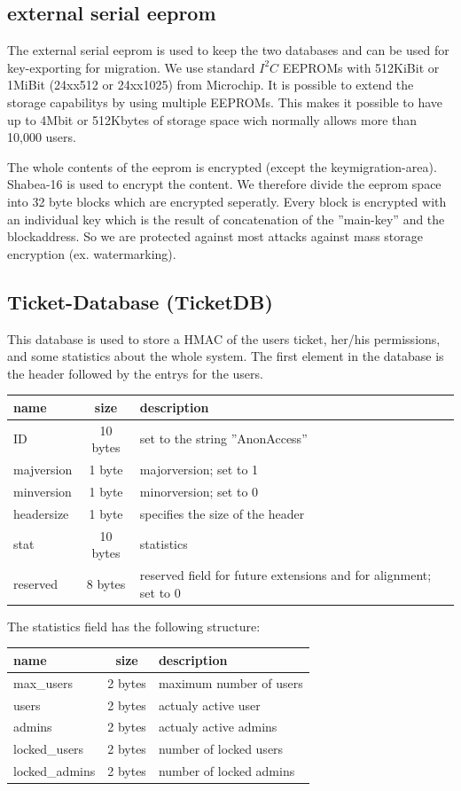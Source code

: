 
\subsection{external serial eeprom}
The external serial eeprom is used to keep the two databases and can be used for key-exporting for migration. We use standard $I^2C$ EEPROMs with 512KiBit or 1MiBit (24xx512 or 24xx1025) from Microchip. It is possible to extend the storage capabilitys by using multiple EEPROMs. This makes it possible to have up to 4Mbit or 512Kbytes of storage space wich normally allows more than 10,000 users.

The whole contents of the eeprom is encrypted (except the keymigration-area). Shabea-16 is used to encrypt the content. We therefore divide the eeprom space into 32 byte blocks which are encrypted seperatly. Every block is encrypted with an individual key which is the result of concatenation of the ''main-key'' and the blockaddress. So we are protected against most attacks against mass storage encryption (ex. watermarking).


\subsection{Ticket-Database (TicketDB)}
This database is used to store a HMAC of the users ticket, her/his permissions, and some statistics about the whole system.
The first element in the database is the header followed by the entrys for the users.\\
\begin{tabular}{|l|c|l|}\hline 
name & size & description \\ \hline
ID & 10 bytes & set to the string ''AnonAccess'' \\
majversion & 1 byte & majorversion; set to 1 \\
minversion & 1 byte & minorversion; set to 0 \\
headersize & 1 byte & specifies the size of the header \\
stat & 10 bytes & statistics \\
reserved & 8 bytes & reserved field for future extensions and for alignment; set to 0 \\ \hline
\end{tabular} 

The statistics field has the following structure:\\
\begin{tabular}{|l|c|l|} \hline
name & size & description \\ \hline 
max\_users     & 2 bytes & maximum number of users \\
users              & 2 bytes & actualy active user \\
admins           & 2 bytes & actualy active admins \\
locked\_users   & 2 bytes & number of locked users \\
locked\_admins & 2 bytes & number of locked admins \\ \hline
\end{tabular} 

